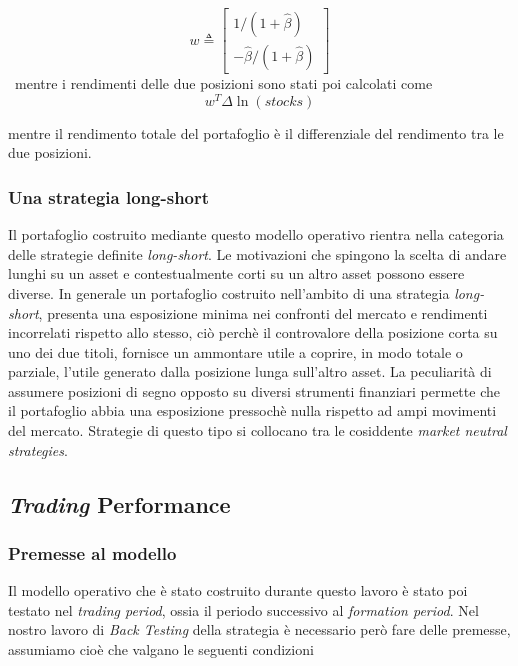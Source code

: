 \documentclass[]{article}
\begin{document}
\begin{equation} 
w\triangleq \begin{bmatrix}
	1/(1 + \hat{\beta}) \\
	-\hat{\beta}/(1 + \hat{\beta})
\end{bmatrix}
\end{equation}
\
mentre i rendimenti delle due posizioni sono stati poi calcolati come
\begin{equation}
	w^T\Delta \ln(stocks)
\end{equation}

mentre il rendimento totale del portafoglio è il differenziale del rendimento tra le due posizioni.

\subsubsection*{Una strategia long-short}

Il portafoglio costruito mediante questo modello operativo rientra nella categoria delle strategie definite \textit{long-short}.
Le motivazioni che spingono la scelta di andare lunghi su un asset e contestualmente corti su un altro asset possono essere diverse.
In generale un portafoglio costruito nell'ambito di una strategia \textit{long-short}, presenta una esposizione minima nei confronti del mercato e rendimenti incorrelati rispetto allo stesso, ciò perchè il controvalore della posizione corta su uno dei due titoli, fornisce un ammontare utile a coprire, in modo totale o parziale, l'utile generato dalla posizione lunga sull'altro asset.
La peculiarità di assumere posizioni di segno opposto su diversi strumenti finanziari permette che il portafoglio abbia una esposizione pressochè nulla rispetto ad ampi movimenti del mercato.
Strategie di questo tipo si collocano tra le cosiddente \textit{market neutral strategies}.


\subsection{\textit{Trading} Performance}

\subsubsection{Premesse al modello}
Il modello operativo che è stato costruito durante questo lavoro è stato poi testato nel \textit{trading period}, ossia il periodo successivo al \textit{formation period}.
Nel nostro lavoro di \textit{Back Testing} della strategia è necessario però fare delle premesse, assumiamo cioè che valgano le
seguenti condizioni
\end{document}
